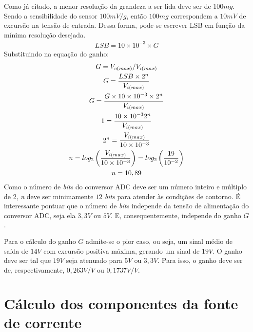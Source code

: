 \documentclass[
	12pt,				%
	openright,			%
	twoside,			%
	a4paper,			%
	english,			%
	french,				%
	spanish,			%
	brazil,				%
	]{abntex2}
\begin{document}
\begin{apendicesenv}
	Como já citado, a menor resolução da grandeza a ser lida deve ser de
	$100mg$. Sendo a sensibilidade do sensor $100mV/g$, então $100mg$
	correspondem a $10mV$ de excursão na tensão de entrada. Dessa forma,
	pode-se escrever LSB em função da mínima resolução desejada.
	\begin{gather*}
		LSB = 10\times 10^{-3}\times G
	\end{gather*}
	Substituindo na equação do ganho:
	\begin{gather*}
		G = V_{o(max)}/V_{i(max)}\\
		G = \frac{LSB\times 2^n}{V_{i(max)}}\\
		G = \frac{G\times 10\times 10^{-3}\times 2^n}{V_{i(max)}}\\
		1 = \frac{10\times 10^{-3}\*2^n}{V_{i(max)}}\\
		2^n = \frac{V_{i(max)}}{10\times 10^{-3}}\\
		n = log_2\left( \frac{V_{i(max)}}{10\times 10^{-3}} \right) = log_2\left( \frac{19}{10^{-2}}\right)\\
		n = 10,89
	\end{gather*}
	Como o número de \textit{bits} do conversor ADC deve ser um número inteiro e múltiplo de $2$, \textit{n}
	deve ser minimamente $12$ \textit{bits} para atender às condições de contorno. É
	interessante pontuar que o número de \textit{bits} independe da tensão de
	alimentação do conversor ADC, seja ela $3,3V$ ou $5V$. E, consequentemente,
	independe do ganho $G$.

	Para o cálculo do ganho $G$ admite-se o pior caso, ou seja, um sinal médio
	de saída de $14V$ com excursão positiva máxima, gerando um sinal de $19V$. O
	ganho deve ser tal que $19V$ seja atenuado para $5V$ ou $3,3V$. Para isso, o
	ganho deve ser de, respectivamente, $0,263V/V$ ou $0,1737V/V$.

\chapter{Cálculo dos componentes da fonte de corrente}
\label{ape:calculoCorrente}


\end{apendicesenv}
\end{document}
